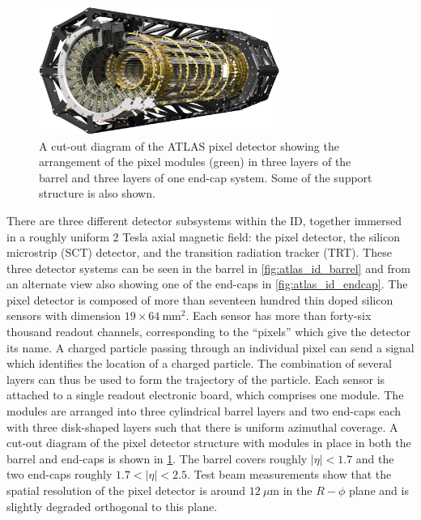 \begin{figure}[ht!]
\centering
\includegraphics[width=0.7\textwidth]{figures/atlas/pixel.eps}
\caption{A cut-out diagram of the ATLAS pixel detector showing 
the arrangement of the pixel modules (green) in three layers of the barrel
and three layers of one end-cap system. Some of the support structure is
also shown.}
\label{fig:atlas_pixel}
\end{figure}

There are three different detector subsystems within the ID, together
immersed in a roughly uniform 2 Tesla axial magnetic field: the pixel detector,
the silicon microstrip (SCT) detector, and the transition radiation
tracker (TRT). These three detector systems can be seen 
in the barrel in \fig\ref{fig:atlas_id_barrel} and from an alternate
view also showing one of the end-caps in \fig\ref{fig:atlas_id_endcap}. 
The pixel detector
is composed of more than seventeen hundred thin doped silicon sensors with 
dimension $19\times 64~\textrm{mm}^2$. Each sensor has more than forty-six
thousand readout channels,
corresponding to the ``pixels'' which give the detector its name. 
A charged particle passing through an individual pixel can send a signal
which identifies the location of a charged particle. The combination of 
several layers can thus be used to form the trajectory of the particle. %
Each sensor is attached to a single readout electronic board, which comprises
one module.
The modules are arranged into three cylindrical barrel layers and 
two end-caps each with three disk-shaped layers such that there is uniform
azimuthal coverage. A cut-out diagram of the pixel detector 
structure with modules in place in both the barrel and end-caps is shown 
in \fig\ref{fig:atlas_pixel}. The barrel covers roughly 
$|\eta|<1.7$ and the two end-caps roughly $1.7<|\eta|<2.5$.
Test beam measurements show that the 
spatial resolution of the pixel detector is around $12~\mu\textrm{m}$ in 
the $R-\phi$ plane and is slightly degraded orthogonal to this plane.



